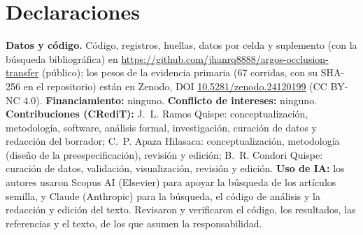 \documentclass[conference]{IEEEtran}
\begin{document}
\section*{Declaraciones}
\textbf{Datos y código.} Código, registros, huellas, datos por celda y suplemento (con la búsqueda bibliográfica) en \url{https://github.com/jhanrq8888/argos-occlusion-transfer} (público); los pesos de la evidencia primaria (67 corridas, con su SHA-256 en el repositorio) están en Zenodo, DOI \href{https://doi.org/10.5281/zenodo.24120199}{\mbox{10.5281/zenodo.24120199}} (CC BY-NC 4.0). \textbf{Financiamiento:} ninguno. \textbf{Conflicto de intereses:} ninguno. \textbf{Contribuciones (CRediT):} J.~L. Ramos Quispe: conceptualización, metodología, software, análisis formal, investigación, curación de datos y redacción del borrador; C.~P. Apaza Hilasaca: conceptualización, metodología (diseño de la preespecificación), revisión y edición; B.~R. Condori Quispe: curación de datos, validación, visualización, revisión y edición. \textbf{Uso de IA:} los autores usaron Scopus AI (Elsevier) para apoyar la búsqueda de los artículos semilla, y Claude (Anthropic) para la búsqueda, el código de análisis y la redacción y edición del texto. Revisaron y verificaron el código, los resultados, las referencias y el texto, de los que asumen la responsabilidad.



\end{document}
